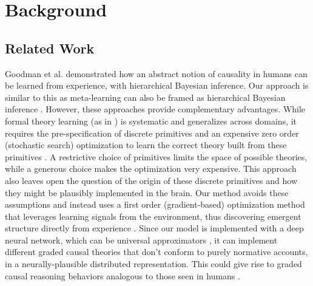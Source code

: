 \section{Background}

\subsection{Related Work}

Goodman et al. \citep{goodman2011learning} demonstrated how an abstract notion of causality in humans can be learned from experience, with hierarchical Bayesian inference. Our approach is similar to this as meta-learning can also be framed as hierarchical Bayesian inference \citep{grant2018recasting}. However, these approaches provide complementary advantages. While formal theory learning (as in \cite{goodman2011learning}) is systematic and generalizes across domains, it requires the pre-specification of discrete primitives and an expensive zero order (stochastic search) optimization to learn the correct theory built from these primitives \citep{schulz2012finding, bramley2018grounding}. A restrictive choice of primitives limits the space of possible theories, while a generous choice makes the optimization very expensive. This approach also leaves open the question of the origin of these discrete primitives and how they might be plausibly implemented in the brain. Our method avoids these assumptions and instead uses a first order (gradient-based) optimization method that leverages learning signals from the environment, thus discovering emergent structure directly from experience \citep{mcclelland2010letting}.
Since our model is implemented with a deep neural network, which can be universal approximators \citep{siegelmann1995computational, hornik1991approximation}, it can implement different graded causal theories that don't conform to purely normative accounts, in a neurally-plausible distributed representation.  This could give rise to graded causal reasoning behaviors analogous to those seen in humans \citep{rehder2014independence, rehder2017failures, fernbach2010neglect, fernbach2013cognitive} . 


